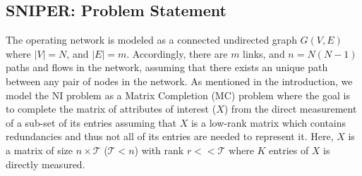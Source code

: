 \subsection{SNIPER: Problem Statement}   \label{subsec:ProbState}
The operating network is modeled as a connected undirected graph $G(V,E)$ where $|V|=N$, and $|E|=m$. Accordingly, there are $m$ links, and $n=N(N-1)$ paths and flows in the network, assuming that there exists an unique path between any pair of nodes in the network. As mentioned in the introduction, we model the NI problem as a Matrix Completion (MC) problem where the goal is to complete the matrix of attributes of interest ($X$) from the direct measurement of a sub-set of its entries assuming that $X$ is a low-rank matrix which contains redundancies and thus not all of its entries are needed to represent it. Here, $X$ is a matrix of size $n \times \mathcal{T}$ ($\mathcal{T}<n$) with rank $r << \mathcal{T}$ where $K$ entries of $X$ is directly measured. 

